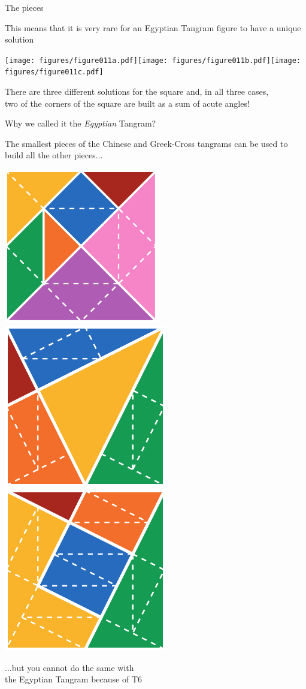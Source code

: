 \documentclass[14pt]{beamer}
\begin{document}

    \begin{frame}{The pieces}
        \begin{center}
            This means that it is very rare for an Egyptian Tangram figure to have a unique solution

            \bigskip \bigskip

            \texttt{[image: figures/figure011a.pdf]}\quad\texttt{[image: figures/figure011b.pdf]}\quad\texttt{[image: figures/figure011c.pdf]} \\

            \vspace{2em}

            {\footnotesize There are three different solutions for the square and, in all three cases,\\two of the corners of the square are built as a sum of acute angles!}
        \end{center}
    \end{frame}


        \begin{frame}{Why we called it the \emph{Egyptian} Tangram?}
        \begin{center}
            The smallest pieces of the Chinese and Greek-Cross tangrams can be used to build all the other pieces...

            \bigskip \bigskip

            \includegraphics[height=15ex]{figures/figure003c.pdf}\quad\includegraphics[height=15ex]{figures/figure003a.pdf}\quad\includegraphics[height=15ex]{figures/figure003b.pdf} \\

            \bigskip \bigskip

            ...but you cannot do the same with\\the Egyptian Tangram because of T6
        \end{center}
    \end{frame}
\end{document}
